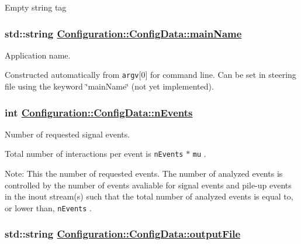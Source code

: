 Empty string tag \hypertarget{classConfiguration_1_1ConfigData_c85dc7aae623ecb7e728e582756d920f}{
\subsubsection[mainName]{\setlength{\rightskip}{0pt plus 5cm}std::string \hyperlink{classConfiguration_1_1ConfigData_c85dc7aae623ecb7e728e582756d920f}{Configuration::Config\-Data::main\-Name}}}
\label{classConfiguration_1_1ConfigData_c85dc7aae623ecb7e728e582756d920f}


Application name. 

Constructed automatically from {\tt argv}\mbox{[}0\mbox{]} for command line. Can be set in steering file using the keyword \char`\"{}main\-Name\char`\"{} (not yet implemented). \hypertarget{classConfiguration_1_1ConfigData_6b90b096ac0ef76c732cfb9ac3b59a1c}{
\subsubsection[nEvents]{\setlength{\rightskip}{0pt plus 5cm}int \hyperlink{classConfiguration_1_1ConfigData_6b90b096ac0ef76c732cfb9ac3b59a1c}{Configuration::Config\-Data::n\-Events}}}
\label{classConfiguration_1_1ConfigData_6b90b096ac0ef76c732cfb9ac3b59a1c}


Number of requested signal events. 

Total number of interactions per event is {\tt n\-Events} {\tt $\ast$} {\tt mu} .

\begin{Desc}
\item[Note:]This the number of requested events. The number of analyzed events is controlled by the number of events avaliable for signal events and pile-up events in the inout stream(s) such that the total number of analyzed events is equal to, or lower than, {\tt n\-Events} . \end{Desc}
\hypertarget{classConfiguration_1_1ConfigData_e750c9a99a34765d813ab55871ea3512}{
\subsubsection[outputFile]{\setlength{\rightskip}{0pt plus 5cm}std::string \hyperlink{classConfiguration_1_1ConfigData_e750c9a99a34765d813ab55871ea3512}{Configuration::Config\-Data::output\-File}}}
\label{classConfiguration_1_1ConfigData_e750c9a99a34765d813ab55871ea3512}


